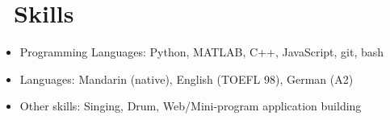 \documentclass{resume}
\begin{document}


\section{\faCogs\ Skills}

\begin{itemize}[parsep=0.5ex]
  \item Programming Languages: Python, MATLAB, C++, JavaScript, git, bash
  \item Languages: Mandarin (native), English (TOEFL 98), German (A2)
  \item Other skills: Singing, Drum, Web/Mini-program application building
\end{itemize}
\end{document}
